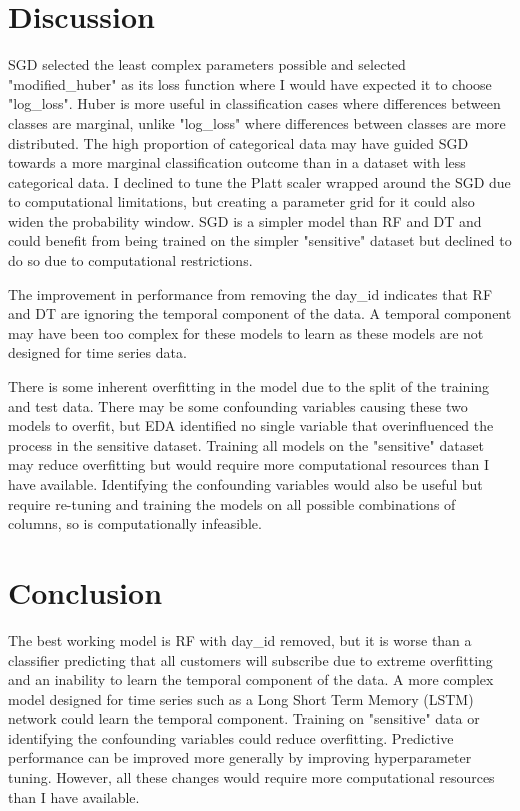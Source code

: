 \documentclass[9pt]{article}
\begin{document}
\section{Discussion}
\vspace{-0.25cm}
SGD selected the least complex parameters possible and selected "modified\_huber" as its loss function where I would have expected it to choose "log\_loss". Huber is more useful in classification cases where differences between classes are marginal, unlike "log\_loss" where differences between classes are more distributed. The high proportion of categorical data may have guided SGD towards a more marginal classification outcome than in a dataset with less categorical data. I declined to tune the Platt scaler wrapped around the SGD due to computational limitations, but creating a parameter grid for it could also widen the probability window. SGD is a simpler model than RF and DT and could benefit from being trained on the simpler "sensitive" dataset but declined to do so due to computational restrictions.

The improvement in performance from removing the day\_id indicates that RF and DT are ignoring the temporal component of the data. A temporal component may have been too complex for these models to learn as these models are not designed for time series data. 

There is some inherent overfitting in the model due to the split of the training and test data. There may be some confounding variables causing these two models to overfit, but EDA identified no single variable that overinfluenced the process in the sensitive dataset. Training all models on the "sensitive" dataset may reduce overfitting but would require more computational resources than I have available. Identifying the confounding variables would also be useful but require re-tuning and training the models on all possible combinations of columns, so is computationally infeasible.

\vspace{-0.25cm}
\section{Conclusion}
\vspace{-0.25cm}
The best working model is RF with day\_id removed, but it is worse than a classifier predicting that all customers will subscribe due to extreme overfitting and an inability to learn the temporal component of the data. A more complex model designed for time series such as a Long Short Term Memory (LSTM) network could learn the temporal component. Training on "sensitive" data or identifying the confounding variables could reduce overfitting. Predictive performance can be improved more generally by improving hyperparameter tuning. However, all these changes would require more computational resources than I have available.
\end{document}
